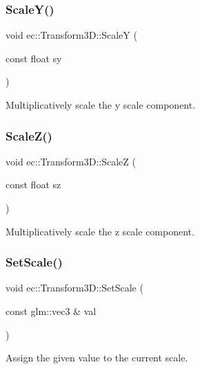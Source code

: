 \subsubsection{\texorpdfstring{Scale\+Y()}{ScaleY()}}
{\footnotesize\ttfamily void ec\+::\+Transform3\+D\+::\+ScaleY (\begin{DoxyParamCaption}\item[{const float}]{sy }\end{DoxyParamCaption})}

Multiplicatively scale the y scale component. \mbox{\label{classec_1_1_transform3_d_aabfade728cf9193d14ab5e726c8ddd0f}} 
\subsubsection{\texorpdfstring{Scale\+Z()}{ScaleZ()}}
{\footnotesize\ttfamily void ec\+::\+Transform3\+D\+::\+ScaleZ (\begin{DoxyParamCaption}\item[{const float}]{sz }\end{DoxyParamCaption})}

Multiplicatively scale the z scale component. \mbox{\label{classec_1_1_transform3_d_ac60d767a4f53241ef68726530da0b984}} 
\subsubsection{\texorpdfstring{Set\+Scale()}{SetScale()}\hspace{0.1cm}{\footnotesize\ttfamily [1/2]}}
{\footnotesize\ttfamily void ec\+::\+Transform3\+D\+::\+Set\+Scale (\begin{DoxyParamCaption}\item[{const glm\+::vec3 \&}]{val }\end{DoxyParamCaption})}

Assign the given value to the current scale. \mbox{\label{classec_1_1_transform3_d_ac3a8b4e7a97700c4761bfadbd6a6b9ec}} 
